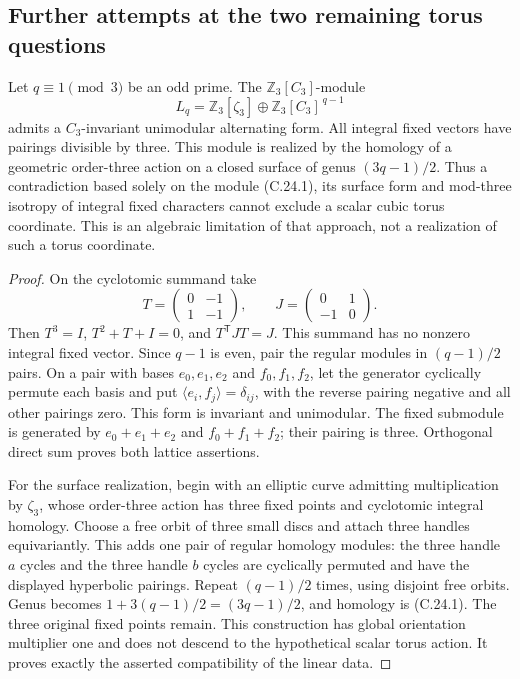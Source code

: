 \subsection{Further attempts at the two remaining torus questions}

Let $q\equiv1\pmod3$ be an odd prime.  The
$\mathbb Z_3[C_3]$-module
\[
 L_q=\mathbb Z_3[\zeta_3]\oplus
                       \mathbb Z_3[C_3]^{\,q-1}             \tag{C.24.1}
\]
admits a $C_3$-invariant unimodular alternating
form.  All integral fixed vectors have pairings
divisible by three.  This module is realized
by the homology of a geometric order-three
action on a closed surface of genus
$(3q-1)/2$.  Thus a contradiction based solely
on the module (C.24.1), its surface form and
mod-three isotropy of integral fixed characters
cannot exclude a scalar cubic torus coordinate.
This is an algebraic limitation of that
approach, not a realization of such a torus
coordinate.

\begin{proof}
On the cyclotomic summand take
\[
 T=\begin{pmatrix}0&-1\\1&-1\end{pmatrix},
 \qquad J=\begin{pmatrix}0&1\\-1&0\end{pmatrix}.
\]
Then $T^3=I$, $T^2+T+I=0$, and
$T^{\mathsf T}JT=J$.  This summand has no
nonzero integral fixed vector.
Since $q-1$ is even, pair the regular modules
in $(q-1)/2$ pairs.  On a pair with bases
$e_0,e_1,e_2$ and $f_0,f_1,f_2$, let the
generator cyclically permute each basis and
put $\langle e_i,f_j\rangle=\delta_{ij}$,
with the reverse pairing negative and all
other pairings zero.  This form is invariant
and unimodular.  The fixed submodule is
generated by $e_0+e_1+e_2$ and
$f_0+f_1+f_2$; their pairing is three.
Orthogonal direct sum proves both lattice
assertions.

For the surface realization, begin with an
elliptic curve admitting multiplication by
$\zeta_3$, whose order-three action has three
fixed points and cyclotomic integral homology.
Choose a free orbit of three small discs and
attach three handles equivariantly.  This
adds one pair of regular homology modules:
the three handle $a$ cycles and the three
handle $b$ cycles are cyclically permuted and
have the displayed hyperbolic pairings.
Repeat $(q-1)/2$ times, using disjoint free
orbits.  Genus becomes
$1+3(q-1)/2=(3q-1)/2$, and homology is
(C.24.1).  The three original fixed points
remain.  This construction has global
orientation multiplier one and does not
descend to the hypothetical scalar torus
action.  It proves exactly the asserted
compatibility of the linear data.
\end{proof}

